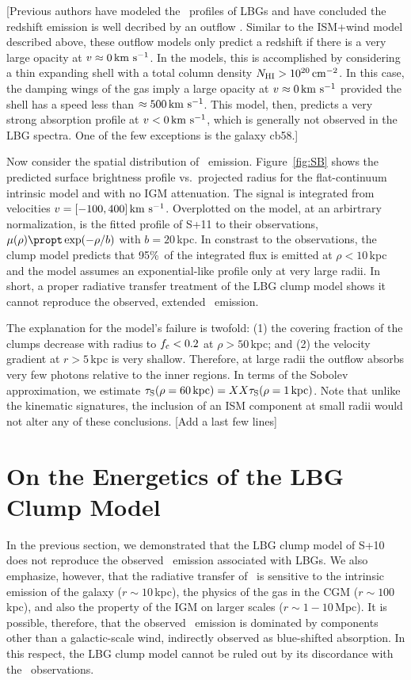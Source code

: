 \documentclass[12pt,preprint]{aastex}
\begin{document}
[Previous authors have modeled the \lya\ profiles of LBGs and have
concluded the redshift emission is well decribed by an outflow
\citep[e.g.][]{verhomme}.  Similar to the
ISM+wind model described above, these outflow models only predict a
redshift if there is a very large opacity at $v \approx 0\, {\rm km~s^{-1}}$.  In
the \cite{verhomme} models, this is accomplished by considering a
thin expanding shell with a total  column density $N_{\rm HI} > 10^{20}
\, {\rm cm^{-2}}$.  In this case, the damping wings of the gas imply a large
opacity at $v \approx 0 \, {\rm km~s^{-1}}$ provided the shell has a speed less
than $\approx 500 \, {\rm km~s^{-1}}$.  This model, then, predicts a very strong
absorption profile at $v < 0 \, {\rm km~s^{-1}}$, which is generally not observed
in the LBG spectra.  One of the few exceptions is the galaxy cb58.]

Now consider the spatial distribution of \lya\ emission.
Figure~\ref{fig:SB} shows the predicted surface brightness profile
vs.\ projected radius for the flat-continuum intrinsic model and with
no IGM attenuation.  The signal is integrated from velocities $v =
[-100,400]\, {\rm km~s^{-1}}$. Overplotted on the model, at an arbirtrary
normalization, is the fitted profile of S+11 to their observations,
$\mu(\rho) \propt \exp(-\rho/b)$ with $b=20$\,kpc.  In constrast to
the observations, the clump model predicts that 95\%\ of the
integrated flux is emitted at $\rho < 10$\,kpc and the model assumes
an exponential-like profile only at very large radii.  In short, a
proper radiative transfer treatment of the LBG clump model shows it
cannot reproduce the observed, extended \lya\ emission.  

The explanation for the model's failure is twofold:  
(1) the covering fraction of the clumps decrease with radius to
$f_{\rm c} < 0.2$ at $\rho > 50$\,kpc; and
(2) the velocity gradient at $r>5$\,kpc is very shallow.  Therefore,
at large radii the outflow absorbs very few photons relative to the
inner regions.  In terms of the Sobolev approximation, we estimate
$\tau_{\rm S}(\rho = 60 \, {\rm kpc}) = XX \tau_{\rm S}(\rho=1\, {\rm
  kpc})$.  
Note that unlike the kinematic signatures, the inclusion of an ISM
component at small radii would not alter any of these conclusions.
[Add a last few lines]


\section{On the Energetics of the LBG Clump Model}
\label{sec:energy}

In the previous section, we demonstrated that the LBG clump model
of S+10 does not reproduce the observed \lya\ emission associated with
LBGs.   We also emphasize, however, that the radiative transfer of
\lya\ is sensitive to the intrinsic emission of the galaxy ($r \sim
10$\,kpc), the physics of the gas in the CGM ($r \sim 100$\,kpc), and
also the property of the IGM on larger scales ($r \sim 1-10$\,Mpc).
It is possible, therefore, that the observed \lya\ emission is
dominated by components other than a galactic-scale wind, indirectly
observed as blue-shifted absorption.  In this respect, the LBG clump
model cannot be ruled out by its discordance with the \lya\
observations.
\end{document}
